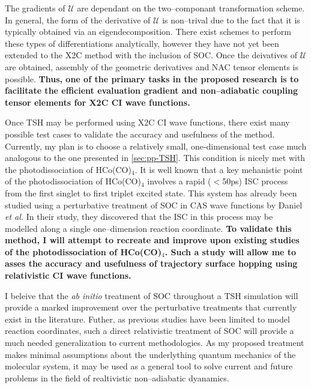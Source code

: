 The gradients of $\mathcal{U}$ are dependant on the two--componant
transformation scheme. In general, the form of the derivative of $\mathcal{U}$
is non--trival due to the fact that it is typically obtained via an
eigendecomposition. There exist schemes to perform these types of
differentiations analytically, however they have not yet been extended to the
X2C method with the inclusion of SOC.  Once the deivatives of $\mathcal{U}$ are
obtained, assembly of the geometric derivatives and NAC tensor elements is
possible. {\bf Thus, one of the primary tasks in the proposed research is to
facilitate the efficient evaluation gradient and non--adiabatic coupling tensor
elements for X2C CI wave functions.}

Once TSH may be performed using X2C CI wave functions, there exist many possible
test cases to validate the accuracy and usefulness of the method. Currently, my
plan is to choose a relatively small, one-dimensional test case much analogous
to the one presented in \cref{sec:pp-TSH}. This condition is nicely met with the
photodissociation of HCo(CO)$_4$. It is well known that a key mehanistic point
of the photodissociation of  HCo(CO)$_4$ involves a rapid ($<$50ps) ISC process
from the first singlet to first triplet excited state. This system has already
been studied using a perturbative treatment of SOC in CAS wave functions by
Daniel \emph{et al.} In their study, they discovered that the ISC in this
process may be modelled along a single one--dimension reaction coordinate. 
{\bf To validate this method, I will attempt to recreate and improve upon
existing studies of the photodissociation of HCo(CO)$_4$. Such a study will
allow me to asses the accuracy and usefulness of trajectory surface hopping
using relativistic CI wave functions.}

I beleive that the \emph{ab initio} treatment of SOC throughout a TSH simulation
will provide a marked improvement over the perturbative treatments that
currently exist in the literature. Futher, as previous studies have been limited
to model reaction coordinates, such a direct relativistic treatment of SOC will
provide a much needed generalization to current methodologies. As my proposed
treatment makes minimal assumptions about the underlything quantum mechanics of
the molecular system, it may be used as a general tool to solve current and
future problems in the field of realtivistic non--adiabatic dyanamics.
